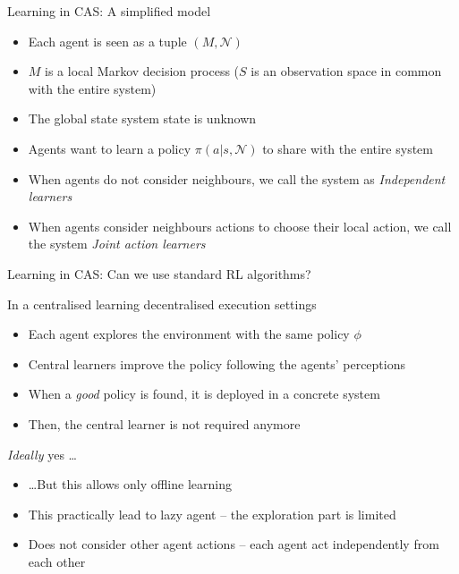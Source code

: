 \documentclass[presentation]{beamer}\mode<presentation>{\usetheme{AMSBolognaFC}}
\begin{document}
\begin{frame}{Learning in CAS: A simplified model}
	\begin{exampleblock}{}		
		\begin{itemize}
			\item Each agent is seen as a tuple $(M, \mathcal{N})$
			\item $M$ is a local Markov decision process ($S$ is an observation space in common with the entire system)
			\item The global state system state is unknown
			\item Agents want to learn a policy $\pi(a | s, \mathcal{N})$ to share with the entire system
			\item When agents do not consider neighbours, we call the system as \emph{Independent learners}
			\item When agents consider neighbours actions to choose their local action, we call the system \emph{Joint action learners} 
		
		\end{itemize}
	\end{exampleblock}
\end{frame}

\begin{frame}{Learning in CAS: Can we use standard RL algorithms?}
	\begin{exampleblock}{In a centralised learning decentralised execution settings}
		\begin{itemize}
			\item Each agent explores the environment with the same policy $\phi$
			\item Central learners improve the policy following the agents' perceptions
			\item When a \emph{good} policy is found, it is deployed in a concrete system
			\item Then, the central learner is not required anymore
		\end{itemize}
	\end{exampleblock}
	\begin{exampleblock}{\emph{Ideally} yes \dots}
		\begin{itemize}
			\item \dots But this allows only offline learning
			\item This practically lead to lazy agent -- the exploration part is limited 
			\item Does not consider other agent actions -- each agent act independently from each other
		\end{itemize}
	\end{exampleblock}
\end{frame}
\end{document}
